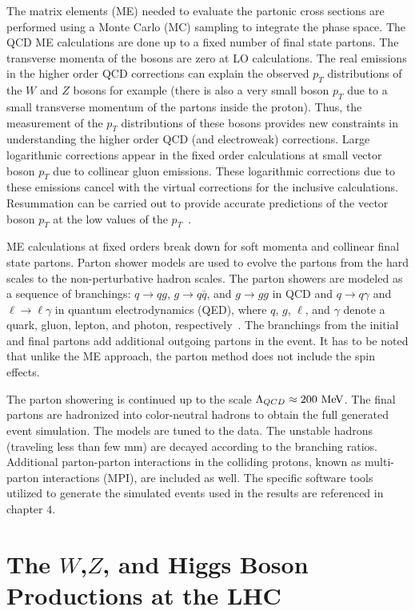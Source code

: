 The matrix elements (ME) needed to evaluate the partonic cross sections are performed using a Monte Carlo (MC) sampling to integrate the phase space. The QCD ME calculations are done up to a fixed number of final state partons. The transverse momenta of the bosons are zero at LO calculations. The real emissions in the higher order QCD corrections can explain the observed $p_{T}$ distributions of the $W$ and $Z$ bosons for example (there is also a very small boson $p_{T}$ due to a small transverse momentum of the partons inside the proton). Thus, the measurement of the $p_{T}$ distributions of these bosons provides new constraints in understanding the higher order QCD (and electroweak) corrections. Large logarithmic corrections appear in the fixed order calculations at small vector boson $p_{T}$ due to collinear gluon emissions. These logarithmic corrections due to these emissions cancel with the virtual corrections for the inclusive calculations. Resummation can be carried out to provide accurate predictions of the vector boson $p_{T}$ at the low values of the $p_T$~\cite{Laenen:1991af}.

ME calculations at fixed orders break down for soft momenta and collinear final state partons. Parton shower models are used to evolve the partons from the hard scales to the non-perturbative hadron scales. The parton showers are modeled as a sequence of branchings: $q \rightarrow qg$, $g \rightarrow q\bar{q}$, and $g \rightarrow g g$ in QCD and $q \rightarrow q\gamma$ and $\ell \rightarrow \ell \gamma$ in quantum electrodynamics (QED), where $q$, $g$, $\ell$, and $\gamma$ denote a quark, gluon, lepton, and photon, respectively~\cite{Schott:2014sea}. The branchings from the initial and final partons add additional outgoing partons in the event. It has to be noted that unlike the ME approach, the parton method does not include the spin effects. 

The parton showering is continued up to the scale $\Lambda_{QCD} \approx 200~\mathrm{Me\kern -0.1em V}$. The final partons are hadronized into color-neutral hadrons to obtain the full generated event simulation. The models are tuned to the data. The unstable hadrons (traveling less than few mm) are decayed according to the branching ratios. Additional parton-parton interactions in the colliding protons, known as multi-parton interactions (MPI), are included as well. The specific software tools utilized to generate the simulated events used in the results are referenced in chapter $4$.  

\section{The $W$,$Z$, and Higgs Boson Productions at the LHC}

